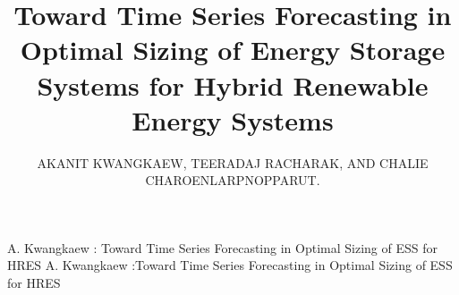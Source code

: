 \documentclass{ieeeaccess}
\begin{document}


\title{Toward Time Series Forecasting in Optimal Sizing of Energy Storage Systems for Hybrid Renewable Energy Systems}

\author{\uppercase{Akanit Kwangkaew}\orcidA{}, %
\uppercase{Teeradaj Racharak\orcidB{}, and Chalie Charoenlarpnopparut}.\orcidC{}
}
\address[1]{School of Information, Computer, and Communication Technology, Sirindhorn International Institute of Technology, Thammasat University, Pathum Thani, Thailand}
\address[2]{School of Information Science, Japan Advanced Institute of Science and Technology, Ishikawa, Japan}




\markboth
{A. Kwangkaew \headeretal: Toward Time Series Forecasting in Optimal Sizing of ESS for HRES}
{A. Kwangkaew \headeretal:Toward Time Series Forecasting in Optimal Sizing of ESS for HRES}

\end{document}
